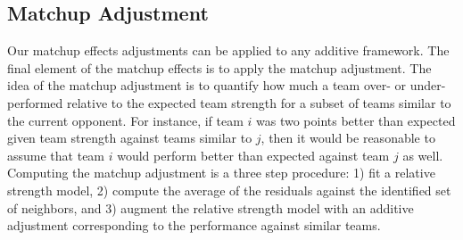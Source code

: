 \documentclass[letterpaper,12pt]{article}
\begin{document}
\subsection{Matchup Adjustment}
Our matchup effects adjustments can be applied to any additive framework. The final element of the matchup effects is to apply the matchup adjustment. The idea of the matchup adjustment is to quantify how much a team over- or under-performed relative to the expected team strength for a subset of teams similar to the current opponent. For instance, if team $i$ was two points better than expected given team strength against teams similar to $j$, then it would be reasonable to assume that team $i$ would perform better than expected against team $j$ as well. Computing the matchup adjustment is a three step procedure: 1) fit a relative strength model, 2) compute the average of the residuals against the identified set of neighbors, and 3) augment the relative strength model with an additive adjustment corresponding to the performance against similar teams.
\end{document}
